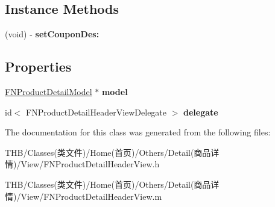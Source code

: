 \subsection*{Instance Methods}
\begin{DoxyCompactItemize}
\item 
\mbox{\label{interface_f_n_product_detail_header_view_aeec79d6ae0e60c9959b84ab7b742cab0}} 
(void) -\/ {\bfseries set\+Coupon\+Des\+:}
\end{DoxyCompactItemize}
\subsection*{Properties}
\begin{DoxyCompactItemize}
\item 
\mbox{\label{interface_f_n_product_detail_header_view_a085dc498d3d2d2f324fedaa68eb893fe}} 
\mbox{\hyperlink{interface_f_n_product_detail_model}{F\+N\+Product\+Detail\+Model}} $\ast$ {\bfseries model}
\item 
\mbox{\label{interface_f_n_product_detail_header_view_a68a5e320c73dde5f0dd6154e308b4cde}} 
id$<$ F\+N\+Product\+Detail\+Header\+View\+Delegate $>$ {\bfseries delegate}
\end{DoxyCompactItemize}


The documentation for this class was generated from the following files\+:\begin{DoxyCompactItemize}
\item 
T\+H\+B/\+Classes(类文件)/\+Home(首页)/\+Others/\+Detail(商品详情)/\+View/F\+N\+Product\+Detail\+Header\+View.\+h\item 
T\+H\+B/\+Classes(类文件)/\+Home(首页)/\+Others/\+Detail(商品详情)/\+View/F\+N\+Product\+Detail\+Header\+View.\+m\end{DoxyCompactItemize}
